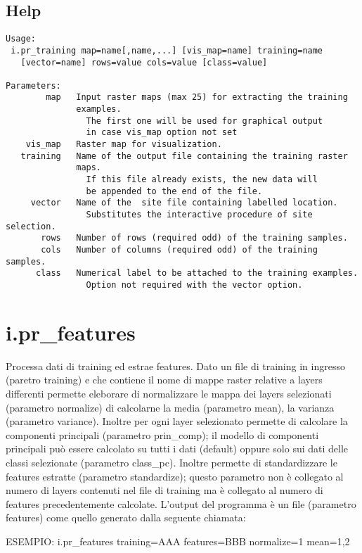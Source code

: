 \subsection*{Help}
\begin{verbatim}
Usage:
 i.pr_training map=name[,name,...] [vis_map=name] training=name
   [vector=name] rows=value cols=value [class=value]

Parameters:
        map   Input raster maps (max 25) for extracting the training
              examples.
                The first one will be used for graphical output
                in case vis_map option not set
    vis_map   Raster map for visualization.
   training   Name of the output file containing the training raster
              maps.
                If this file already exists, the new data will
                be appended to the end of the file.
     vector   Name of the  site file containing labelled location.
                Substitutes the interactive procedure of site selection.
       rows   Number of rows (required odd) of the training samples.
       cols   Number of columns (required odd) of the training samples.
      class   Numerical label to be attached to the training examples.
                Option not required with the vector option.
\end{verbatim}

\section{i.pr\_features}
Processa dati di training ed estrae features. Dato un file di training
in ingresso (paretro training) e che contiene il nome di mappe raster
relative a layers differenti permette eleborare di normalizzare le
mappa dei layers selezionati (parametro normalize) di calcolarne la
media (parametro mean), la varianza (parametro variance). Inoltre per
ogni layer selezionato permette di calcolare la componenti principali
(parametro prin\_comp); il modello di componenti principali pu\`{o}
essere calcolato su tutti i dati (default) oppure solo sui dati delle
classi selezionate (parametro class\_pc). Inoltre permette di
standardizzare le features estratte (parametro standardize); questo
parametro non \`{e} collegato al numero di layers contenuti nel file di
training ma \`{e} collegato al numero di features precedentemente
calcolate. L'output del programma \`{e} un file (parametro features) come quello generato dalla seguente chiamata:

ESEMPIO: i.pr\_features training=AAA features=BBB normalize=1 mean=1,2

